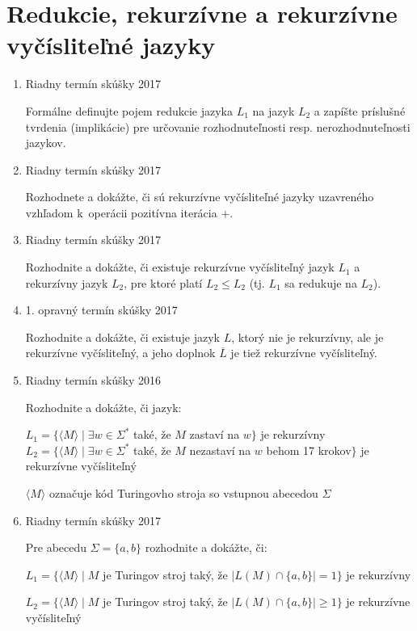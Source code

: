 \documentclass[]{article}
\begin{document}
	\section{Redukcie, rekurzívne a rekurzívne vyčísliteľné jazyky}
	\begin{enumerate}
		\item Riadny termín skúšky 2017
		
		Formálne definujte pojem redukcie jazyka $L_1$ na jazyk $L_2$ a zapíšte príslušné tvrdenia (implikácie) pre určovanie rozhodnuteľnosti resp. nerozhodnuteľnosti jazykov.
		
		\item Riadny termín skúšky 2017
		
		Rozhodnete a dokážte, či sú rekurzívne vyčísliteľné jazyky uzavreného vzhľadom k~operácii pozitívna iterácia +.
		
		\item Riadny termín skúšky 2017
		
		Rozhodnite a dokážte, či existuje rekurzívne vyčísliteľný jazyk $L_1$ a rekurzívny jazyk $L_2$, pre ktoré platí $L_2 \leq L_2$ (tj. $L_1$ sa redukuje na $L_2$).
		
		\item 1. opravný termín skúšky 2017
		
		Rozhodnite a dokážte, či existuje jazyk $L$, ktorý nie je rekurzívny, ale je rekurzívne vyčísliteľný, a jeho doplnok $\overline{L}$ je tiež rekurzívne vyčísliteľný.
		
		\item Riadny termín skúšky 2016
		
		Rozhodnite a dokážte, či jazyk:
		
		$L_1 = \{\langle M \rangle \mid \exists w \in \Sigma^*$ také, že $M$ zastaví na $w\}$ je rekurzívny
		$L_2 = \{\langle M \rangle \mid \exists w \in \Sigma^*$ také, že $M$ nezastaví na $w$ behom 17 krokov$\}$ je rekurzívne vyčísliteľný
	
		$\langle M \rangle$ označuje kód Turingovho stroja so vstupnou abecedou $\Sigma$
		
		\item Riadny termín skúšky 2017
		
		Pre abecedu $\Sigma = \{a, b\}$ rozhodnite a dokážte, či:
		
		$L_1 = \{\langle M \rangle \mid M$ je Turingov stroj taký, že $\vert L(M) \cap \{a,b\} \vert = 1\}$ je rekurzívny
		
		$L_2 = \{\langle M \rangle \mid M$ je Turingov stroj taký, že $\vert L(M) \cap \{a,b\} \vert \geq 1\}$ je rekurzívne vyčísliteľný
		

\end{enumerate}
\end{document}
